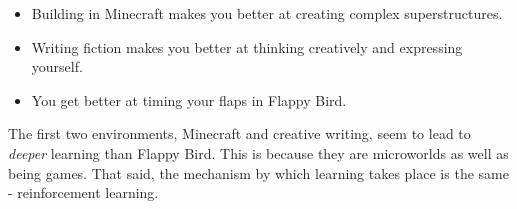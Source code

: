 \begin{itemize}

\item Building in Minecraft makes you better at creating complex superstructures.
\item Writing fiction makes you better at thinking creatively and expressing yourself.
\item You get better at timing your flaps in Flappy Bird.

\end{itemize}

The first two environments, Minecraft and creative writing, seem to lead to \emph{deeper} learning than Flappy Bird. This is because they are microworlds as well as being games. That said, the mechanism by which learning takes place is the same - reinforcement learning.
